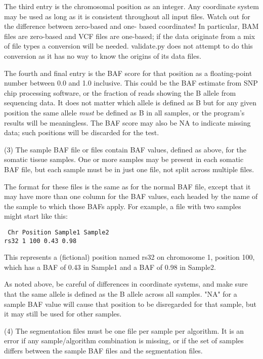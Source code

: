 \documentclass{article}
\begin{document}
The third entry is the chromosomal position as an integer.  Any coordinate
system may be used as long as it is consistent throughout all input
files.  Watch out for the difference between zero-based and one-
based coordinates! In particular, BAM files are zero-based and
VCF files are one-based; if the data originate from a mix of file 
types a conversion will be needed.  validate.py does not attempt to 
do this conversion as it has no way to know the origins of its data files.

The fourth and final entry is the BAF score for that position as
a floating-point number between 0.0 and 1.0 inclusive.  This
could be the BAF estimate from SNP chip processing software, or
the fraction of reads showing the B allele from sequencing data.  It
does not matter which allele is defined as B but for any given
position the same allele {\it must}
be defined as B in all samples, or the program's results will be
meaningless.  The BAF score may also be
NA to indicate missing data; such positions will be discarded for
the test.

(3)  The sample BAF file or files contain BAF values, defined as
above, for the somatic tissue samples.  One or more samples may be
present in each somatic BAF file, but each sample must be
in just one file, not split across multiple files.

The format for these files is the same as for the normal BAF file,
except that it may have more than one column for the BAF values,
each headed by the name of the sample to which those BAFs apply.
For example, a file with two samples might start like this:

{\flushleft
{\tt
	Chr	Position	Sample1	Sample2 \\
rs32	1	100	0.43	0.98 \\
}}
\bigskip

This represents a (fictional) position named rs32 on chromosome 1,
position 100, which has a BAF of 0.43 in Sample1 and a BAF of
0.98 in Sample2.

As noted above, be careful of differences in coordinate systems,
and make sure that the same allele is defined as the B allele
across all samples.  "NA" for a sample BAF value will cause that
position to be disregarded for that sample, but it may still be
used for other samples.

(4)  The segmentation files must be one file per sample per algorithm.
It is an error if any sample/algorithm combination is missing, or
if the set of samples differs between the sample BAF files and the
segmentation files.
\end{document}
